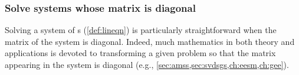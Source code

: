 \subsubsection{Solve systems whose matrix is diagonal}

Solving a system of s (\cref{def:lineqn}) is particularly straightforward when the matrix of the system is diagonal.
Indeed, much mathematics in both theory and applications is devoted to transforming a given problem so that the matrix appearing in the  system is diagonal (e.g., \cref{sec:amss,sec:svdsgs,ch:eesm,ch:gee}).

\begin{comment}
Here prepare for using the \svd, but also use diagonal matrices to reinforce the translation to/from matrix and symbolic forms, and to reinforce zero, one, many solutions.
\end{comment}%



